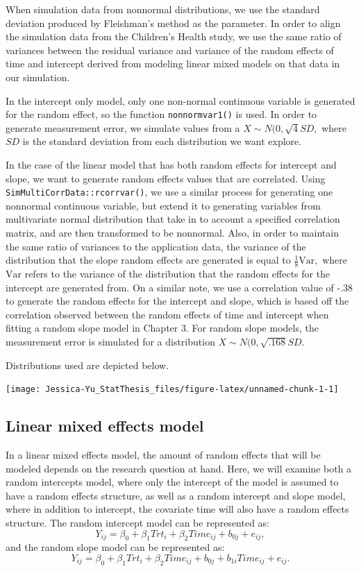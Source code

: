 \documentclass[12pt, twoside]{amherstthesis}
\begin{document}
When simulation data from nonnormal distributions, we use the standard deviation produced by Fleishman's method as the parameter. In order to align the simulation data from the Children's Health study, we use the same ratio of variances between the residual variance and variance of the random effects of time and intercept derived from modeling linear mixed models on that data in our simulation.

In the intercept only model, only one non-normal continuous variable is generated for the random effect, so the function \texttt{nonnormvar1()} is used. In order to generate measurement error, we simulate values from a \(X\sim\mathit{N}(0,\sqrt{4}SD,\) where \(SD\) is the standard deviation from each distribution we want explore.

In the case of the linear model that has both random effects for intercept and slope, we want to generate random effects values that are correlated. Using \texttt{SimMultiCorrData::rcorrvar()}, we use a similar process for generating one nonnormal continuous variable, but extend it to generating variables from multivariate normal distribution that take in to account a specified correlation matrix, and are then transformed to be nonnormal. Also, in order to maintain the same ratio of variances to the application data, the variance of the distribution that the slope random effects are generated is equal to \(\frac{1}{8}\text{Var},\) where \(\text{Var}\) refers to the variance of the distribution that the random effects for the intercept are generated from. On a similar note, we use a correlation value of -.38 to generate the random effects for the intercept and slope, which is based off the correlation observed between the random effects of time and intercept when fitting a random slope model in Chapter 3. For random slope models, the measurement error is simulated for a distribution \(X\sim\mathit{N}(0,\sqrt{.168}SD.\)

Distributions used are depicted below.
\begin{center}\texttt{[image: Jessica-Yu\_StatThesis\_files/figure-latex/unnamed-chunk-1-1]} \end{center}

\hypertarget{linear-mixed-effects-model}{%
\subsection{Linear mixed effects model}\label{linear-mixed-effects-model}}

In a linear mixed effects model, the amount of random effects that will be modeled depends on the research question at hand. Here, we will examine both a random intercepts model, where only the intercept of the model is assumed to have a random effects structure, as well as a random intercept and slope model, where in addition to intercept, the covariate time will also have a random effects structure. The random intercept model can be represented as: \[Y_{ij} = \beta_0 + \beta_1Trt_i + \beta_2Time_{ij} + b_{0j} + e_{ij},\] and the random slope model can be represented as: \[Y_{ij} = \beta_0 + \beta_1Trt_i + \beta_2Time_{ij} + b_{0j} + b_{1i}Time_{ij} + e_{ij}.\]
\end{document}
